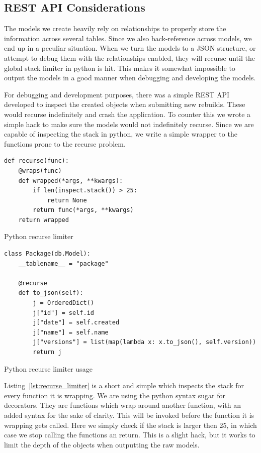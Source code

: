 \documentclass[../Main/thesis.tex]{subfiles}
\begin{document}
\subsection*{REST API Considerations}%
\label{sub:api_considerations}
The models we create heavily rely on relationships to properly store the
information across several tables. Since we also back-reference across models,
we end up in a peculiar situation. When we turn the models to a JSON structure,
or attempt to debug them with the relationships enabled, they will recurse until
the global stack limiter in python is hit. This makes it somewhat impossible to
output the models in a good manner when debugging and developing the models.

For debugging and development purposes, there was a simple REST API developed to
inspect the created objects when submitting new rebuilds. These would recurse
indefinitely and crash the application. To counter this we wrote a simple hack
to make sure the models would not indefinitely recurse. Since we are capable of
inspecting the stack in python, we write a simple wrapper to the functions prone
to the recurse problem.

\begin{listing}
\begin{verbatim}
def recurse(func):
    @wraps(func)
    def wrapped(*args, **kwargs):
        if len(inspect.stack()) > 25:
            return None
        return func(*args, **kwargs)
    return wrapped
\end{verbatim}
\caption{Python recurse limiter}
\label{lst:recurse_limiter}
\end{listing}

\begin{listing}
\begin{verbatim}
class Package(db.Model):
    __tablename__ = "package"

    @recurse
    def to_json(self):
        j = OrderedDict()
        j["id"] = self.id
        j["date"] = self.created
        j["name"] = self.name
        j["versions"] = list(map(lambda x: x.to_json(), self.version))
        return j

\end{verbatim}
\caption{Python recurse limiter usage}
\label{lst:recurse_limiter_usage}
\end{listing}

Listing~\ref{lst:recurse_limiter} is a short and simple which inspects the stack
for every function it is wrapping. We are using the python syntax sugar for
decorators. They are functions which wrap around another function, with an added
syntax for the sake of clarity. This will be invoked before the function it is
wrapping gets called. Here we simply check if the stack is larger then 25, in
which case we stop calling the functions an return. This is a slight hack, but
it works to limit the depth of the objects when outputting the raw models.
\end{document}
